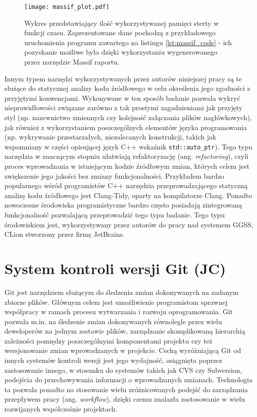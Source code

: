 \begin{figure}[H]
\centering
\texttt{[image: massif\_plot.pdf]}
\caption{Wykres przedstawiający ilość wykorzystywanej pamięci sterty w funkcji czasu. Zaprezentowane dane pochodzą z przykładowego uruchomienia programu zawartego na listingu \ref{lst:massif_code} - ich pozyskanie możliwe było dzięki wykorzystaniu wygenerowanego przez narzędzie Massif raportu.}
\label{fig:massif_plot}
\end{figure}

Innym typem narzędzi wykorzystywanych przez autorów niniejszej pracy są te służące do statycznej analizy kodu źródłowego w celu określenia jego zgodności z przyjętymi konwencjami. Wykonywane w ten sposób badanie pozwala wykryć nieprawidłowości związane zarówno z tak prostymi zagadnieniami jak przyjęty styl (np. nazewnictwo zmiennych czy kolejność załączania plików nagłówkowych), jak również z wykorzystaniem poszczególnych elementów języka programowania (np. wykrywanie przestarzałych, niezalecanych konstrukcji, takich jak wspomniany w części opisującej język C++ wskaźnik \lstinline{std::auto_ptr}). Tego typu narzędzia w znaczącym stopniu ułatwiają refaktoryzację (ang. \emph{refactoring}), czyli proces wprowadzania w istniejącym kodzie źródłowym zmian, których celem jest zwiększenie jego jakości bez zmiany funkcjonalności. Przykładem bardzo popularnego wśród programistów C++ narzędzia przeprowadzającego statyczną analizę kodu źródłowego jest Clang-Tidy, oparty na kompilatorze Clang. Ponadto nowoczesne środowiska programistyczne bardzo często posiadają zintegrowaną funkcjonalność pozwalającą przeprowadzić tego typu badanie. Tego typu środowiskiem jest, wykorzystywany przez autorów do pracy nad systemem GGSS, CLion stworzony przez firmę JetBrains.


\section{System kontroli wersji Git (JC)}
Git jest narzędziem służącym do śledzenia zmian dokonywanych na zadanym zbiorze plików. Głównym celem jest umożliwienie programistom sprawnej współpracy w ramach procesu wytwarzania i rozwoju oprogramowania. Git pozwala m.in. na śledzenie zmian dokonywanych równolegle przez wielu deweloperów na jednym zestawie plików, zarządzanie skomplikowaną hierarchią zależności pomiędzy poszczególnymi komponentami projektu czy też wersjonowanie zmian wprowadzanych w projekcie. Cechą wyróżniającą Git od innych systemów kontroli wersji jest jego wydajność, osiągnięta poprzez zastosowanie innego, w stosunku do systemów takich jak CVS czy Subversion, podejścia do przechowywania informacji o wprowadzanych zmianach. Technologia ta pozwala ponadto na stosowanie wielu zróżnicowanych podejść do zarządzania przepływem pracy (ang. \emph{workflow}), dzięki czemu znalazła zastosowanie w wielu rozwijanych współcześnie projektach.

